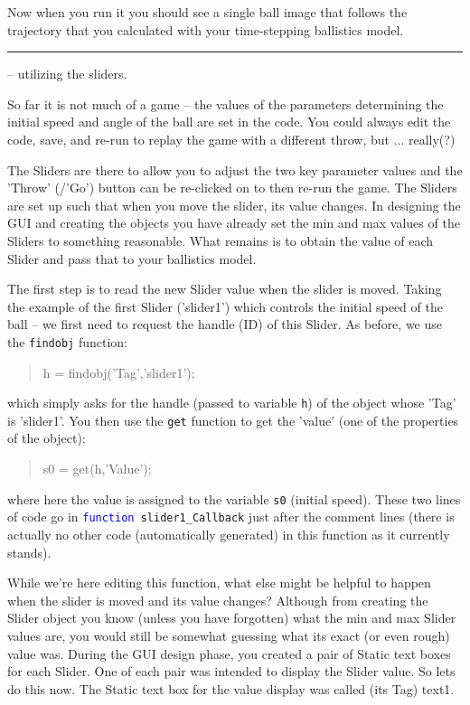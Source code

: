 \documentclass{tufte-book} %
\newenvironment{docspec}{\begin{quotation}\ttfamily\parskip0pt\parindent0pt\ignorespaces}{\end{quotation}}
\begin{document}
Now when you run it you should see a single ball image that follows the  trajectory that you calculated with your time-stepping ballistics model.

\vspace{1mm}
\noindent\rule{4cm}{0.5pt}
\vspace{-2mm}

 -- utilizing the sliders.

So far it is not much of a game -- the values of the parameters determining the initial speed and angle of the ball are set in the code. You could always edit the code, save, and re-run to replay the game with a different throw, but ... really(?)

The \textsf{Sliders} are there to allow you to adjust the two key parameter values and the 'Throw' (/'Go') button can be re-clicked on to then re-run the game. The \textsf{Sliders} are set up such that when you move the slider, its value changes. In designing the GUI and creating the objects you have already set the min and max values of the \textsf{Sliders} to something reasonable. What remains is to obtain the value of each \textsf{Slider} and pass that to your ballistics model.

The first step is to read the new \textsf{Slider} value when the slider is moved. Taking the example of the first \textsf{Slider} ('\textsf{slider1}') which controls the initial speed of the ball -- we first need to request the handle (ID) of this \textsf{Slider}. As before, we use the \texttt{findobj} function:
\begin{docspec}
h = findobj(\textcolor[rgb]{0.501961,0,1}{'Tag'},\textcolor[rgb]{0.501961,0,1}{'slider1'});
\end{docspec}
which simply asks for the handle (passed to variable \texttt{h}) of the object whose '\textsf{Tag}' is '\textsf{slider1}'. You then use the \texttt{get} function to get the '\textsf{value}' (one of the properties of the object):
\begin{docspec}
s0 = get(h,\textcolor[rgb]{0.501961,0,1}{'Value'});
\end{docspec}
where here the value is assigned to the variable \texttt{s0} (initial speed). These two lines of code go in \texttt{\textcolor{blue}{function} slider1\_Callback} just after the comment lines (there is actually no other code (automatically generated) in this function as it currently stands). 

While we're here editing this function, what else might be helpful to happen when the slider is moved and its value changes? Although from creating the \textsf{Slider} object you know (unless you have forgotten) what the min and max \textsf{Slider} values are, you would still be somewhat guessing what its exact (or even rough) value was. During the GUI design phase, you created a pair of \textsf{Static text} boxes for each \textsf{Slider}. One of each pair was intended to display the \textsf{Slider} value. So lets do this now. The \textsf{Static text} box for the value display was called (its \textsf{Tag}) \textsf{text1}.
\end{document}
